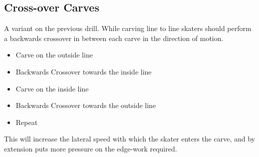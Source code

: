 \subsection*{Cross-over Carves}

A variant on the previous drill. 
While carving line to line skaters should perform a backwards crossover in between each carve in the direction of motion.

\begin{itemize}
    \item Carve on the outside line
    \item Backwards Crossover towards the inside line 
    \item Carve on the inside line
    \item Backwards Crossover towards the outside line
    \item Repeat 
\end{itemize}

This will increase the lateral speed with which the skater enters the carve, and by extension puts more pressure on the edge-work required.      


